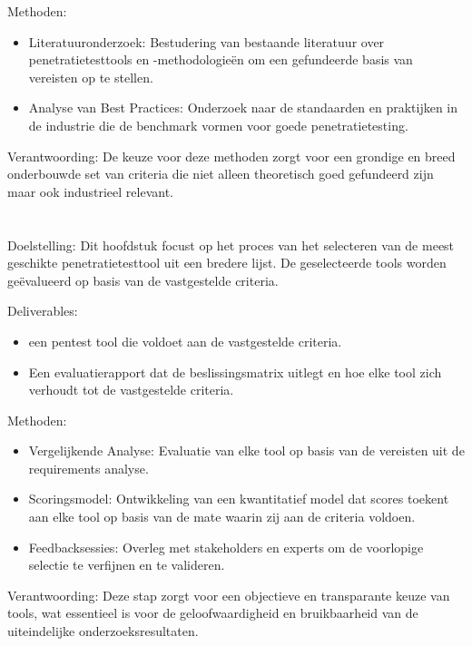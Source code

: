 Methoden:
\begin{itemize}
    \item Literatuuronderzoek: Bestudering van bestaande literatuur over penetratietesttools en -methodologieën om een gefundeerde basis van vereisten op te stellen.
    \item Analyse van Best Practices: Onderzoek naar de standaarden en praktijken in de industrie die de benchmark vormen voor goede penetratietesting.
\end{itemize}

Verantwoording: De keuze voor deze methoden zorgt voor een grondige en breed onderbouwde set van criteria die niet alleen theoretisch 
goed gefundeerd zijn maar ook industrieel relevant.

\section{}
Doelstelling: Dit hoofdstuk focust op het proces van het selecteren van de meest geschikte penetratietesttool uit een 
bredere lijst. De geselecteerde tools worden geëvalueerd op basis van de vastgestelde criteria.

Deliverables:
\begin{itemize}
    \item een pentest tool die voldoet aan de vastgestelde criteria.
    \item Een evaluatierapport dat de beslissingsmatrix uitlegt en hoe elke tool zich verhoudt tot de vastgestelde criteria.
\end{itemize}

Methoden:
\begin{itemize}
    \item Vergelijkende Analyse: Evaluatie van elke tool op basis van de vereisten uit de requirements analyse.
    \item Scoringsmodel: Ontwikkeling van een kwantitatief model dat scores toekent aan elke tool op basis van de mate waarin zij aan de criteria voldoen.
    \item Feedbacksessies: Overleg met stakeholders en experts om de voorlopige selectie te verfijnen en te valideren.
\end{itemize}

Verantwoording: Deze stap zorgt voor een objectieve en transparante keuze van tools, wat essentieel is voor de 
geloofwaardigheid en bruikbaarheid van de uiteindelijke onderzoeksresultaten.

